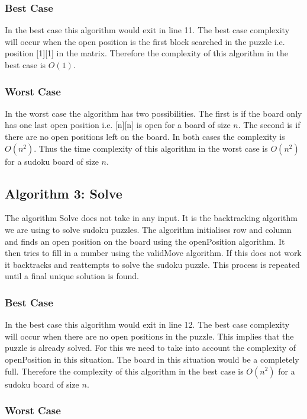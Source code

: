 \documentclass[12pt,a4paper,titlepage]{article}
\begin{document}
\subsubsection{Best Case}

In the best case this algorithm would exit in line 11. The best case complexity will occur when the open position is the first block searched in the puzzle i.e. position [1][1] in the matrix. Therefore the complexity of this algorithm in the best case is $O(1)$.

\subsubsection{Worst Case}

In the worst case the algorithm has two possibilities. The first is if the board only has one last open position i.e. [n][n] is open for a board of size $n$. The second is if there are no open positions left on the board. In both cases the complexity is $O(n^{2})$. Thus the time complexity of this algorithm in the worst case is $O(n^{2})$ for a sudoku board of size $n$.

\subsection{Algorithm 3: Solve}

The algorithm Solve does not take in any input. It is the backtracking algorithm we are using to solve sudoku puzzles. The algorithm initialises row and column and finds an open position on the board using the openPosition algorithm. It then tries to fill in a number using the validMove algorithm. If this does not work it backtracks and reattempts to solve the sudoku puzzle. This process is repeated until a final unique solution is found.

\subsubsection{Best Case}

In the best case this algorithm would exit in line 12. The best case complexity will occur when there are no open positions in the puzzle. This implies that the puzzle is already solved. For this we need to take into account the complexity of openPosition in this situation. The board in this situation would be a completely full. Therefore the complexity of this algorithm in the best case is $O(n^{2})$ for a sudoku board of size $n$.


\subsubsection{Worst Case}
\end{document}
